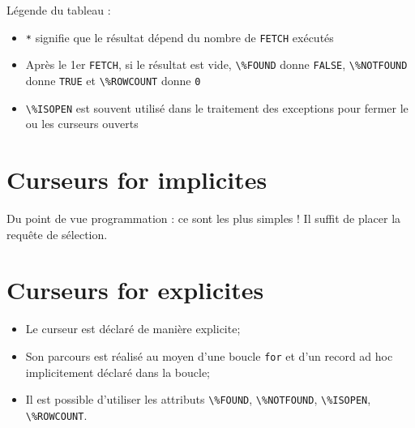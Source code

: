 \documentclass[10pt]{beamer}
\begin{document}
\begin{frame}{\secname}
    Légende du tableau :
    \begin{itemize}
        \item \lstinline[language=plsql]!*! signifie que le résultat dépend du nombre de \lstinline[language=plsql]!FETCH! exécutés
        \item Après le 1er \lstinline[language=plsql]!FETCH!, si le résultat est vide, \lstinline[language=plsql]!\%FOUND! donne \lstinline[language=plsql]!FALSE!, \lstinline[language=plsql]!\%NOTFOUND! donne \lstinline[language=plsql]!TRUE! et \lstinline[language=plsql]!\%ROWCOUNT! donne \lstinline[language=plsql]!0!
        \item \lstinline[language=plsql]!\%ISOPEN! est souvent utilisé dans le traitement des exceptions pour fermer le ou les curseurs ouverts
    \end{itemize}
    
\end{frame}


\section{Curseurs for implicites}
\begin{frame}{\secname}
    Du point de vue programmation : ce sont les plus simples ! Il suffit de placer la requête de sélection.
    
\end{frame}


\section{Curseurs for explicites}
\begin{frame}{\secname}
    \begin{itemize}
        \item Le curseur est déclaré de manière explicite;
        \item Son parcours est réalisé au moyen d'une boucle \lstinline[language=plsql]!for! et d'un record ad hoc implicitement déclaré dans la boucle;
        \item Il est possible d'utiliser les attributs \lstinline[language=plsql]!\%FOUND!, \lstinline[language=plsql]!\%NOTFOUND!, \lstinline[language=plsql]!\%ISOPEN!, \lstinline[language=plsql]!\%ROWCOUNT!.
    \end{itemize}
\end{frame}
\end{document}

